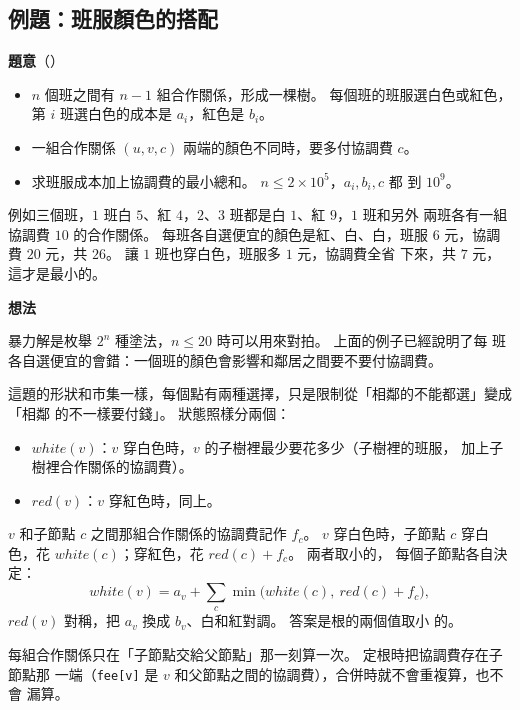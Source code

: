 \subsection{例題：班服顏色的搭配}
\label{sec:tdp-ex-shirts}

\textbf{題意}（）

\begin{itemize}
\item $n$ 個班之間有 $n - 1$ 組合作關係，形成一棵樹。 每個班的班服選白色或紅色，
第 $i$ 班選白色的成本是 $a_i$，紅色是 $b_i$。
\item 一組合作關係 $(u, v, c)$ 兩端的顏色不同時，要多付協調費 $c$。
\item 求班服成本加上協調費的最小總和。 $n \le 2 \times 10^5$，$a_i, b_i, c$ 都
到 $10^9$。
\end{itemize}

例如三個班，$1$ 班白 $5$、紅 $4$，$2$、$3$ 班都是白 $1$、紅 $9$，$1$ 班和另外
兩班各有一組協調費 $10$ 的合作關係。 每班各自選便宜的顏色是紅、白、白，班服
$6$ 元，協調費 $20$ 元，共 $26$。 讓 $1$ 班也穿白色，班服多 $1$ 元，協調費全省
下來，共 $7$ 元，這才是最小的。

\textbf{想法}

暴力解是枚舉 $2^n$ 種塗法，$n \le 20$ 時可以用來對拍。 上面的例子已經說明了每
班各自選便宜的會錯：一個班的顏色會影響和鄰居之間要不要付協調費。

這題的形狀和市集一樣，每個點有兩種選擇，只是限制從「相鄰的不能都選」變成「相鄰
的不一樣要付錢」。 狀態照樣分兩個：

\begin{itemize}
\item $\mathit{white}(v)$：$v$ 穿白色時，$v$ 的子樹裡最少要花多少（子樹裡的班服，
加上子樹裡合作關係的協調費）。
\item $\mathit{red}(v)$：$v$ 穿紅色時，同上。
\end{itemize}

$v$ 和子節點 $c$ 之間那組合作關係的協調費記作 $f_c$。 $v$ 穿白色時，子節點 $c$
穿白色，花 $\mathit{white}(c)$；穿紅色，花 $\mathit{red}(c) + f_c$。 兩者取小的，
每個子節點各自決定：
\[
\mathit{white}(v) = a_v + \sum_c \min\bigl(\mathit{white}(c),\ \mathit{red}(c) + f_c\bigr),
\]
$\mathit{red}(v)$ 對稱，把 $a_v$ 換成 $b_v$、白和紅對調。 答案是根的兩個值取小
的。

每組合作關係只在「子節點交給父節點」那一刻算一次。 定根時把協調費存在子節點那
一端（\texttt{fee[v]} 是 $v$ 和父節點之間的協調費），合併時就不會重複算，也不會
漏算。

